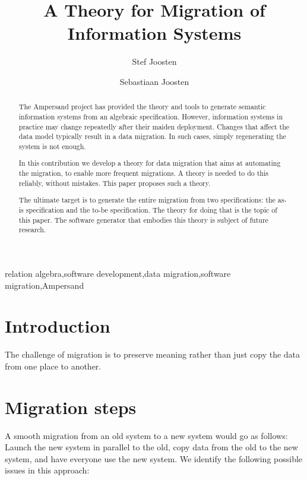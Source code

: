 \documentclass{elsarticle}
\begin{document}


\title{A Theory for Migration of Information Systems}
\author[ou,ordina]{Stef Joosten}
\author[umn]{Sebastiaan Joosten}
\address[ou]{Open Universiteit Nederland, Heerlen, the Netherlands}
\address[ordina]{Ordina NV, Nieuwegein, the Netherlands}
\address[umn]{University of Minnesota, Minneapolis, USA}

\begin{abstract}
	The Ampersand project has provided the theory and tools to generate semantic information systems from an algebraic specification.
	However, information systems in practice may change repeatedly after their maiden deployment.
	Changes that affect the data model typically result in a data migration.
	In such cases, simply regenerating the system is not enough.

	In this contribution we develop a theory for data migration that aims at automating the migration,
	to enable more frequent migrations.
	A theory is needed to do this reliably, without mistakes.
	This paper proposes such a theory.

	The ultimate target is to generate the entire migration from two specifications: the as-is specification and the to-be specification.
	The theory for doing that is the topic of this paper.
	The software generator that embodies this theory is subject of future research.
\end{abstract}

\begin{keyword}
relation algebra\sep software development\sep data migration\sep software migration\sep Ampersand
\end{keyword}
\maketitle

\section{Introduction}
\label{sct:Introduction}
	The challenge of migration is to preserve meaning rather than just copy the data from one place to another.

\section{Migration steps}
	A smooth migration from an old system to a new system would go as follows:
	Launch the new system in parallel to the old, copy data from the old to the new system, and have everyone use the new system.
	We identify the following possible issues in this approach:
\end{document}
